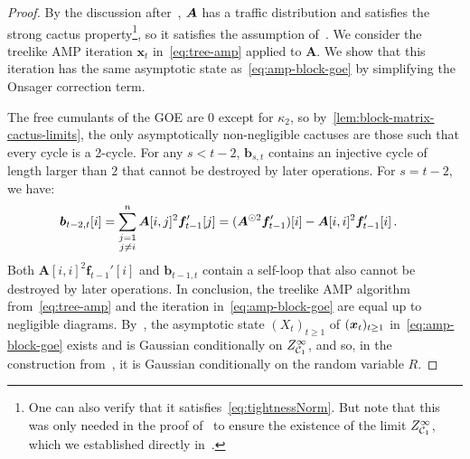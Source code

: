 \begin{proof}
    By the discussion after~, ${\bm A}$ has a traffic distribution and satisfies the strong cactus
    property\footnote{One can also verify that it satisfies~\cref{eq:tightnessNorm}. But note that this was only needed in the proof of~ to ensure the existence of the limit $Z^\infty_{{\cal C}_1}$, which we established directly in~.}, so it satisfies
    the assumption of~.
    We consider the treelike AMP iteration $\bm x_t$
    in~\cref{eq:tree-amp} applied to
    $\bm A$.
    We show that this iteration
    has the same asymptotic state
    as~\cref{eq:amp-block-goe} by
    simplifying the Onsager correction term.
    
    The free cumulants of the GOE are $0$ except for $\kappa_2$, so by~\cref{lem:block-matrix-cactus-limits}, the only asymptotically non-negligible cactuses are those such that every cycle is a 2-cycle.
    For any
    $s < t-2$, $\bm b_{s,t}$ contains an injective cycle
    of length larger than $2$ that cannot be
    destroyed by later operations. For $s=t-2$,
    we have:
    \begin{align*}
        {\bm b}_{t-2,t}[i] &= \sum_{\substack{j = 1\\j \neq i}}^n {\bm A}[i,j]^2 {\bm f}'_{t-1}[j] = (\bm A^{\odot 2} \bm f_{t-1}')[i] - \bm A[i,i]^2 \bm f_{t-1}'[i]\,.
    \end{align*}
    Both $\bm A[i,i]^2 \bm f_{t-1}'[i]$ and
    $\bm b_{t-1,t}$ contain a self-loop that also
    cannot be destroyed by later operations.
    In conclusion, the treelike AMP algorithm from~\cref{eq:tree-amp} and the iteration in~\cref{eq:amp-block-goe} are equal up to negligible diagrams.
    By~,
    the asymptotic state $(X_t)_{t\ge 1}$ of $({\bm x}_t)_{t\ge 1}$ in~\cref{eq:amp-block-goe} exists and
    is Gaussian conditionally on
    $Z^\infty_{{\cal C}_1}$, and so, in the construction from~, it is Gaussian conditionally on the random variable $R$. 


\end{proof}

